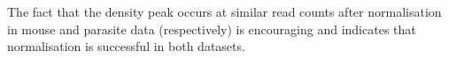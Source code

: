 \documentclass{article}
\begin{document}
The fact that the density peak occurs at similar read counts after normalisation in mouse and parasite data (respectively) is encouraging and indicates that normalisation is successful in both datasets. 






%

%

\end{document}
